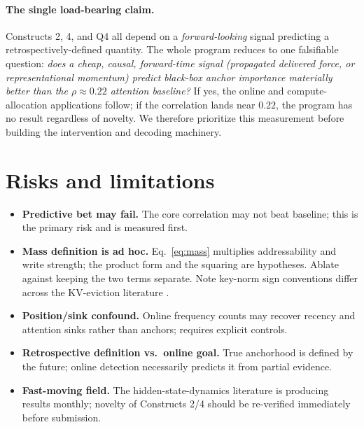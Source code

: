 \documentclass[11pt]{article}
\begin{document}
\paragraph{The single load-bearing claim.} Constructs 2, 4, and Q4 all depend on a
\emph{forward-looking} signal predicting a retrospectively-defined quantity. The whole program
reduces to one falsifiable question: \emph{does a cheap, causal, forward-time signal (propagated
delivered force, or representational momentum) predict black-box anchor importance materially
better than the $\rho\approx0.22$ attention baseline?} If yes, the online and compute-allocation
applications follow; if the correlation lands near $0.22$, the program has no result regardless of
novelty. We therefore prioritize this measurement before building the intervention and decoding
machinery.

\section{Risks and limitations}
\begin{itemize}[leftmargin=1.4em,itemsep=2pt]
\item \textbf{Predictive bet may fail.} The core correlation may not beat baseline; this is the
primary risk and is measured first.
\item \textbf{Mass definition is ad hoc.} Eq.~\eqref{eq:mass} multiplies addressability and write
strength; the product form and the squaring are hypotheses. Ablate against keeping the two terms
separate. Note key-norm sign conventions differ across the KV-eviction literature
\cite{guo2024attention}.
\item \textbf{Position/sink confound.} Online frequency counts may recover recency and attention
sinks rather than anchors; requires explicit controls.
\item \textbf{Retrospective definition vs.\ online goal.} True anchorhood is defined by the future;
online detection necessarily predicts it from partial evidence.
\item \textbf{Fast-moving field.} The hidden-state-dynamics literature is producing results
monthly; novelty of Constructs 2/4 should be re-verified immediately before submission.
\end{itemize}
\end{document}
